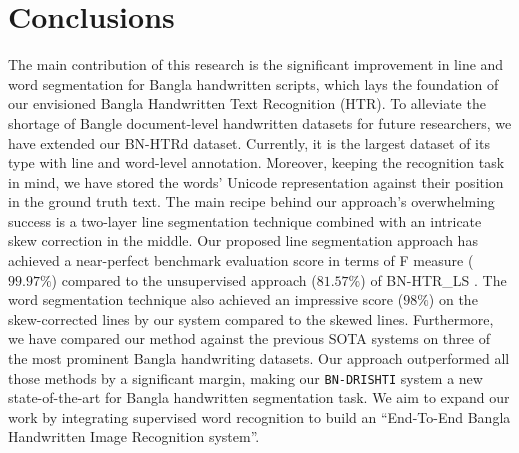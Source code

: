\documentclass[runningheads]{llncs}
\begin{document}
\section{Conclusions}
\vspace{-1mm}
The main contribution of this research is the significant improvement in line and word segmentation for Bangla handwritten scripts, which lays the foundation of our envisioned Bangla Handwritten Text Recognition (HTR). To alleviate the shortage of Bangle document-level handwritten datasets for future researchers, we have extended our BN-HTRd dataset. Currently, it is the largest dataset of its type with line and word-level annotation. Moreover, keeping the recognition task in mind, we have stored the words' Unicode representation against their position in the ground truth text. The main recipe behind our approach's overwhelming success is a two-layer line segmentation technique combined with an intricate skew correction in the middle. Our proposed line segmentation approach has achieved a near-perfect benchmark evaluation score in terms of F measure ($99.97\%$) compared to the unsupervised approach ($81.57\%$) of BN-HTR\_LS \cite{rahman2023bn}. The word segmentation technique also achieved an impressive score ($98\%$) on the skew-corrected lines by our system compared to the skewed lines. Furthermore, we have compared our method against the previous SOTA systems on three of the most prominent Bangla handwriting datasets. Our approach outperformed all those methods by a significant margin, making our \texttt{BN-DRISHTI} system a new state-of-the-art for Bangla handwritten segmentation task. We aim to expand our work by integrating supervised word recognition to build an “End-To-End Bangla Handwritten Image Recognition system”.





\end{document}
